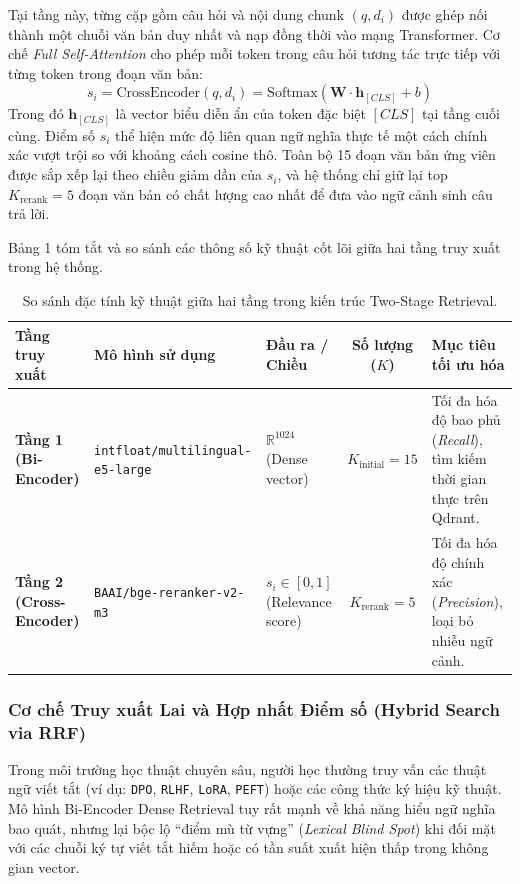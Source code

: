 ﻿\documentclass[12pt]{article}
\begin{document}
Tại tầng này, từng cặp gồm câu hỏi và nội dung chunk $(q, d_i)$ được ghép nối thành một chuỗi văn bản duy nhất và nạp đồng thời vào mạng Transformer. Cơ chế \textit{Full Self-Attention} cho phép mỗi token trong câu hỏi tương tác trực tiếp với từng token trong đoạn văn bản:
\begin{equation}
    s_i = \text{CrossEncoder}(q, d_i) = \text{Softmax}\left(\mathbf{W} \cdot \mathbf{h}_{[CLS]} + b\right)
\end{equation}
Trong đó $\mathbf{h}_{[CLS]}$ là vector biểu diễn ẩn của token đặc biệt $[CLS]$ tại tầng cuối cùng. Điểm số $s_i$ thể hiện mức độ liên quan ngữ nghĩa thực tế một cách chính xác vượt trội so với khoảng cách cosine thô. Toàn bộ 15 đoạn văn bản ứng viên được sắp xếp lại theo chiều giảm dần của $s_i$, và hệ thống chỉ giữ lại top $K_{\text{rerank}} = 5$ đoạn văn bản có chất lượng cao nhất để đưa vào ngữ cảnh sinh câu trả lời.

Bảng 1 tóm tắt và so sánh các thông số kỹ thuật cốt lõi giữa hai tầng truy xuất trong hệ thống.

\begin{table}[H]
\centering
\small
\begin{tabularx}{\linewidth}{@{}l p{4.2cm} p{2.8cm} c p{4.5cm}@{}}
\toprule
\textbf{Tầng truy xuất} & \textbf{Mô hình sử dụng} & \textbf{Đầu ra / Chiều} & \textbf{Số lượng ($K$)} & \textbf{Mục tiêu tối ưu hóa} \\
\midrule
\textbf{Tầng 1 (Bi-Encoder)} & \texttt{intfloat/multilingual-e5-large} & $\mathbb{R}^{1024}$ (Dense vector) & $K_{\text{initial}} = 15$ & Tối đa hóa độ bao phủ (\textit{Recall}), tìm kiếm thời gian thực trên Qdrant. \\
\addlinespace[4pt]
\textbf{Tầng 2 (Cross-Encoder)} & \texttt{BAAI/bge-reranker-v2-m3} & $s_i \in [0, 1]$ (Relevance score) & $K_{\text{rerank}} = 5$ & Tối đa hóa độ chính xác (\textit{Precision}), loại bỏ nhiễu ngữ cảnh. \\
\bottomrule
\end{tabularx}
\caption{So sánh đặc tính kỹ thuật giữa hai tầng trong kiến trúc Two-Stage Retrieval.}
\end{table}

\subsubsection{Cơ chế Truy xuất Lai và Hợp nhất Điểm số (Hybrid Search via RRF)}
Trong môi trường học thuật chuyên sâu, người học thường truy vấn các thuật ngữ viết tắt (ví dụ: \texttt{DPO}, \texttt{RLHF}, \texttt{LoRA}, \texttt{PEFT}) hoặc các công thức ký hiệu kỹ thuật. Mô hình Bi-Encoder Dense Retrieval tuy rất mạnh về khả năng hiểu ngữ nghĩa bao quát, nhưng lại bộc lộ ``điểm mù từ vựng'' (\textit{Lexical Blind Spot}) khi đối mặt với các chuỗi ký tự viết tắt hiếm hoặc có tần suất xuất hiện thấp trong không gian vector.
\end{document}
